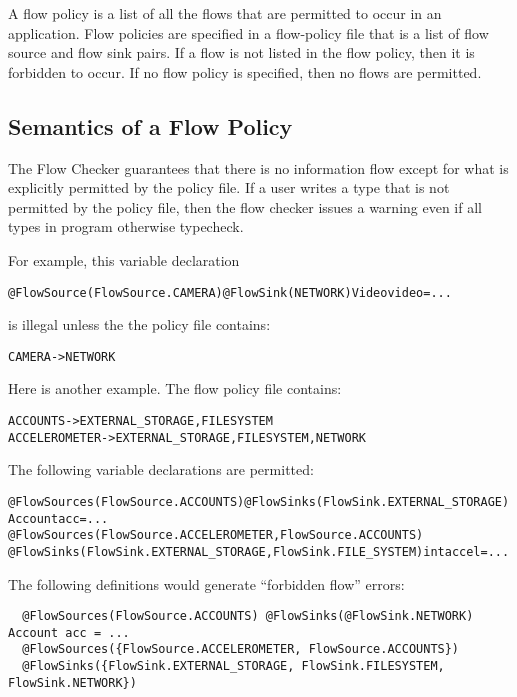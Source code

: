 A flow policy is a list of all the flows that are permitted to occur in an application.
Flow policies are specified in a flow-policy file that is  a list 
 of flow source and flow sink pairs.  If a flow is not listed in the flow policy, then 
 it is forbidden to occur.  If no flow policy is specified, then no flows are permitted. 
 
\subsection{Semantics of a Flow Policy}
\label{sec:undsiredflows}
The Flow Checker guarantees that there is no information
flow except for what is explicitly permitted by the policy file. If a user writes a type that is
not permitted by the policy file, then the flow checker issues a warning
even if all types in program otherwise typecheck.

For example, this variable declaration

\begin{alltt}
@FlowSource(FlowSource.CAMERA) @FlowSink(NETWORK) Video video = ...
\end{alltt}

\noindent
is illegal unless the the policy file contains:

\begin{alltt}
CAMERA -> NETWORK
\end{alltt}

Here is another example.
The flow policy file contains:
\begin{alltt}
  ACCOUNTS      -> EXTERNAL_STORAGE, FILESYSTEM
  ACCELEROMETER -> EXTERNAL_STORAGE, FILESYSTEM, NETWORK
\end{alltt}

The following variable declarations are permitted:
\begin{alltt}
  @FlowSources(FlowSource.ACCOUNTS) @FlowSinks(FlowSink.EXTERNAL_STORAGE) Account acc = ...
  @FlowSources({FlowSource.ACCELEROMETER, FlowSource.ACCOUNTS})
  @FlowSinks({FlowSink.EXTERNAL_STORAGE, FlowSink.FILE_SYSTEM}) int accel = ...
\end{alltt}

The following definitions would generate ``forbidden flow'' errors:
\begin{Verbatim}
  @FlowSources(FlowSource.ACCOUNTS) @FlowSinks(@FlowSink.NETWORK) Account acc = ...
  @FlowSources({FlowSource.ACCELEROMETER, FlowSource.ACCOUNTS})
  @FlowSinks({FlowSink.EXTERNAL_STORAGE, FlowSink.FILESYSTEM, FlowSink.NETWORK})
\end{Verbatim}


